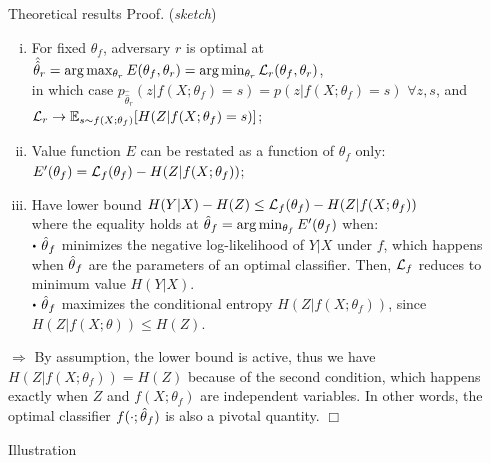 \documentclass[final]{beamer}
\newcommand{\qedwhite}{\hfill \ensuremath{\Box}}
\newcommand\sbullet[1][.5]{\mathbin{\vcenter{\hbox{\scalebox{#1}{$\bullet$}}}}}
\begin{document}
\begin{frame}{}
\begin{textblock}{0.32}
\begin{block}{Theoretical results \phantom{p}}
Proof. (\textit{sketch})\\
\begin{enumerate}[(i)]
\item For fixed $\theta_f$, adversary $r$ is optimal at $\hat{\hat\theta}_r = \arg \max_{\theta_r} E(\theta_f, \theta_r)  = \arg \min_{\theta_r} {\cal L}_r(\theta_f, \theta_r)$,\\
in which case $p_{\hat{\hat\theta}_r}(z|f(X;\theta_f)=s) = p(z|f(X;\theta_f)=s)$ $\forall z, s$, and\\
${\cal L}_r \to \mathbb{E}_{s \sim f(X;\theta_f)} [ H({Z|f(X;\theta_f)=s}) ]$;

\item Value function $E$ can be restated as a function of $\theta_f$ only: \\
$E'(\theta_f) = {\cal L}_f(\theta_f) -  H({Z|f(X;\theta_f)})$; 

\item Have lower bound $H({Y|X}) - H(Z) \leq {\cal L}_f(\theta_f) - H({Z|f(X;\theta_f)})$ \\
where the equality holds at $\smash{\hat\theta}_f = \arg \min_{\theta_f} E'(\theta_f)$ when: \\
 $\sbullet$ $\smash{\hat\theta}_f$ minimizes the negative log-likelihood of $Y|X$ under $f$,
    which happens when $\smash{\hat\theta}_f$ are the parameters
    of an optimal classifier. Then, ${\cal L}_f$ reduces to 
    minimum value $H({Y|X})$. \\
  $\sbullet$ $\smash{\hat\theta}_f$ maximizes the conditional entropy
    $H({Z|f(X;\theta_f)})$, since $H(Z|f(X;\theta)) \leq H(Z)$.
\end{enumerate}


$\Rightarrow$ By assumption, the lower bound is active, thus we have $H(Z|f(X;\theta_f)) = H(Z)$
because of the second condition, which happens exactly when $Z$ and $f(X;\theta_f)$
are independent variables. In other words,  the
optimal classifier $f(\cdot;\smash{\hat\theta}_f)$ is also a pivotal
quantity. \qedwhite

\vspace{0.3cm}

\end{block}

\begin{block}{Illustration \phantom{p}}

\end{block}

\end{textblock}



\end{frame}
\end{document}
